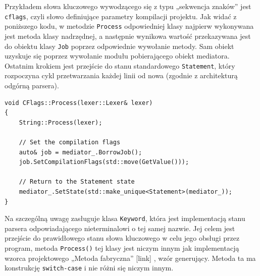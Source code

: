 Przykładem słowa kluczowego wywodzącego się z typu „sekwencja znaków” jest \texttt{cflags}, czyli słowo definiujące parametry kompilacji projektu. Jak widać z poniższego kodu, w metodzie \texttt{Process} odpowiedniej klasy najpierw wykonywana jest metoda klasy nadrzędnej, a następnie wynikowa wartość przekazywana jest do obiektu klasy \texttt{Job} poprzez odpowiednie wywołanie metody. Sam obiekt uzyskuje się poprzez wywołanie modułu pobierającego obiekt mediatora. Ostatnim krokiem jest przejście do stanu standardowego \texttt{Statement}, który rozpoczyna cykl przetwarzania każdej linii od nowa (zgodnie z architekturą odgórną parsera).

\begin{lstlisting}[label=list:cflags,caption=Metoda CFlags::Process(),basicstyle=\footnotesize\ttfamily]
void CFlags::Process(lexer::Lexer& lexer)
{
    String::Process(lexer);

    // Set the compilation flags
    auto& job = mediator_.BorrowJob();
    job.SetCompilationFlags(std::move(GetValue()));

    // Return to the Statement state
    mediator_.SetState(std::make_unique<Statement>(mediator_));
}
\end{lstlisting}
    
Na szczególną uwagę zasługuje klasa \texttt{Keyword}, która jest implementacją stanu parsera odpowiadającego nieterminalowi o tej samej nazwie. Jej celem jest przejście do prawidłowego stanu słowa kluczowego w celu jego obsługi przez program, metoda \texttt{Process()} tej klasy jest niczym innym jak implementacją wzorca projektowego „Metoda fabryczna” [link] , wzór generujący. Metoda ta ma konstrukcję \texttt{switch-case} i nie różni się niczym innym.

